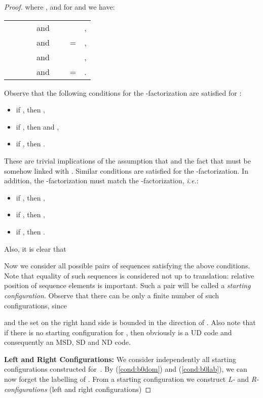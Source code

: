\documentclass[final,nomarks]{dmtcs-episciences}
\begin{document}
\begin{proof}
where ,  and for  and 
we have:
\begin{center}
\begin{tabular}{rclcrcl}
  &  &                           & \ and\  &   &  & ,\\
 &  &  & \ and\  &  & =      & ,\\
  &  &                           & \ and\  &   &  & ,\\
 &  &  & \ and\  &  & =      & .
\end{tabular}
\end{center}
Observe that the following conditions for the -factorization are satisfied for :
\begin{itemize}
 \item if ,
 then ,
 \item if ,
 then  and ,
 \item if ,
 then .
\end{itemize}
These are trivial implications of the assumption that  and the fact that  must be somehow linked with .
Similar conditions are satisfied for the -factorization.
In addition, the -factorization must match the -factorization, \textit{i.e.}:
\begin{itemize}
 \item if ,
 then ,
 \item if ,
 then ,
 \item if ,
 then .
\end{itemize}
Also, it is clear that


Now we consider all possible pairs of sequences  satisfying the above
conditions. Note that equality of such sequences is considered not up to translation: 
relative position of sequence elements is important. Such a pair will be called a
\emph{starting configuration}. Observe that there can be only a finite number of such
 configurations, since

and the set on the right hand side is bounded in the direction of .
Also note that if there is no starting configuration for , then obviously  is a 
UD code and consequently an MSD, SD and ND code.


\textbf{Left and Right Configurations:}
We consider independently all starting configurations constructed for~.
By (\ref{cond:b0dom}) and (\ref{cond:b0lab}), we can now forget the
labelling of . From a starting configuration  
we construct \emph{L-} and
\emph{R-configurations} (left and right configurations)


\end{proof}
\end{document}
